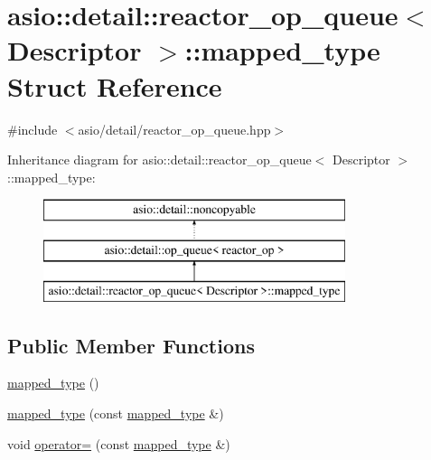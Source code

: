 \hypertarget{structasio_1_1detail_1_1reactor__op__queue_1_1mapped__type}{}\section{asio\+:\+:detail\+:\+:reactor\+\_\+op\+\_\+queue$<$ Descriptor $>$\+:\+:mapped\+\_\+type Struct Reference}
\label{structasio_1_1detail_1_1reactor__op__queue_1_1mapped__type}


{\ttfamily \#include $<$asio/detail/reactor\+\_\+op\+\_\+queue.\+hpp$>$}

Inheritance diagram for asio\+:\+:detail\+:\+:reactor\+\_\+op\+\_\+queue$<$ Descriptor $>$\+:\+:mapped\+\_\+type\+:\begin{figure}[H]
\begin{center}
\leavevmode
\includegraphics[height=3.000000cm]{structasio_1_1detail_1_1reactor__op__queue_1_1mapped__type}
\end{center}
\end{figure}
\subsection*{Public Member Functions}
\begin{DoxyCompactItemize}
\item 
\hyperlink{structasio_1_1detail_1_1reactor__op__queue_1_1mapped__type_a8eecf21b862553449b8036077a0de894}{mapped\+\_\+type} ()
\item 
\hyperlink{structasio_1_1detail_1_1reactor__op__queue_1_1mapped__type_a20efecd14323f9f1b8c82eef06e7a02f}{mapped\+\_\+type} (const \hyperlink{structasio_1_1detail_1_1reactor__op__queue_1_1mapped__type}{mapped\+\_\+type} \&)
\item 
void \hyperlink{structasio_1_1detail_1_1reactor__op__queue_1_1mapped__type_acab59db2ea8a1cae44407589740de342}{operator=} (const \hyperlink{structasio_1_1detail_1_1reactor__op__queue_1_1mapped__type}{mapped\+\_\+type} \&)
\end{DoxyCompactItemize}



